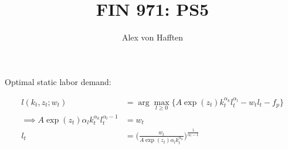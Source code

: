 \documentclass{article}
\title{FIN 971: PS5}
\author{Alex von Hafften}
\begin{document}
\maketitle

Optimal static labor demand:

\begin{align*}
l(k_t, z_t; w_t) &= \arg \max_{l \ge 0} \{ A \exp(z_t) k_t ^{\alpha_k} l_t ^{\alpha_l} - w_t l_t - f_p\}\\
\implies
A \exp(z_t) \alpha_l k_t ^{\alpha_k} l_t ^{\alpha_l - 1}  &= w_t\\
 l_t   &= \Bigg(\frac{w_t}{A \exp(z_t) \alpha_l k_t ^{\alpha_k}}\Bigg)^{\frac{1}{\alpha_l - 1}} \\
\end{align*}
\end{document}
